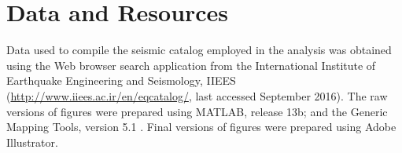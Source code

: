 
\section{Data and Resources}

Data used to compile the seismic catalog employed in the analysis was obtained using the Web browser search application from the International Institute of Earthquake Engineering and Seismology, IIEES (\url{http://www.iiees.ac.ir/en/eqcatalog/}, last accessed September 2016). The raw versions of figures were prepared using MATLAB\textsuperscript{\textregistered}, release 13b; and the Generic Mapping Tools, version 5.1 \citep[\url{http://gmt.soest.hawaii.edu;}][]{Wessel_2013_EOS}. Final versions of figures were prepared using Adobe\textsuperscript{\textregistered} Illustrator\textsuperscript{\textregistered}.